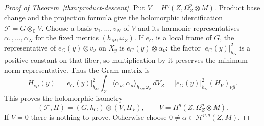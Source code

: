 \documentclass[11pt,reqno]{amsart}
\numberwithin{equation}{section}
\theoremstyle{definition}
\theoremstyle{remark}
\begin{document}
\begin{proof}[Proof of Theorem~\ref{thm:product-descent}]
Put $V=H^q(Z,\Omega_Z^p\otimes M)$.  Product base change and the
projection formula give the holomorphic identification
$\mathcal F=G\otimes_{\mathbb C}V$.  Choose a basis
$v_1,\ldots,v_N$ of $V$ and its harmonic representatives
$\alpha_1,\ldots,\alpha_N$ for the fixed metrics $(h_M,\omega_Z)$.
If $e_G$ is a local frame of $G$, the representative of
$e_G(y)\otimes v_\nu$ on $X_y$ is $e_G(y)\otimes\alpha_\nu$:
the factor $|e_G(y)|_{h_G}^2$ is a positive constant on that fiber,
so multiplication by it preserves the minimum-norm representative.
Thus the Gram matrix is
\[
 H_{\nu\bar\mu}(y)
  =|e_G(y)|_{h_G}^2
       \int_Z\langle\alpha_\nu,\alpha_\mu\rangle_{h_M,\omega_Z}\,dV_Z
  =|e_G(y)|_{h_G}^2(H_V)_{\nu\bar\mu}.
\]
This proves the holomorphic isometry
\begin{equation}\label{eq:product-isometry}
 (\mathcal F,H)=(G,h_G)\otimes(V,H_V),\qquad
 V=H^q(Z,\Omega_Z^p\otimes M).
\end{equation}
If $V=0$ there is nothing to prove.  Otherwise choose
$0\ne\alpha\in\mathcal H^{p,q}(Z,M)$.


\end{proof}
\end{document}
